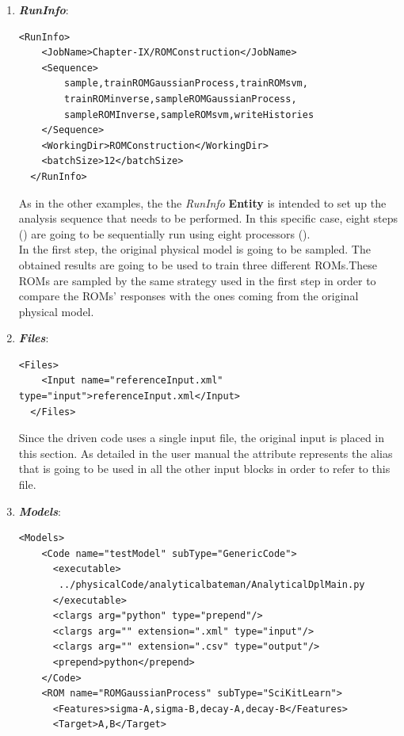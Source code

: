 \begin{enumerate}
   \item \textbf{\textit{RunInfo}}:
\begin{lstlisting}[style=XML,morekeywords={arg,extension,pauseAtEnd,overwrite}]
  <RunInfo>
    <JobName>Chapter-IX/ROMConstruction</JobName>
    <Sequence>
        sample,trainROMGaussianProcess,trainROMsvm,
        trainROMinverse,sampleROMGaussianProcess,
        sampleROMInverse,sampleROMsvm,writeHistories
    </Sequence>
    <WorkingDir>ROMConstruction</WorkingDir>
    <batchSize>12</batchSize>
  </RunInfo>
\end{lstlisting}
   As in the other examples, the the \textit{RunInfo} \textbf{Entity} is intended  to set up the analysis sequence that
   needs to be performed. In this specific case, eight steps  () are going to be sequentially run
   using eight processors ().
   \\In the first step, the original physical model is going to be sampled. The obtained results are going to be used to
   train three different ROMs.These ROMs are sampled by the same strategy used in the first step in order to compare the
   ROMs' responses with the ones coming from the original physical model.
   \item \textbf{\textit{Files}}:
\begin{lstlisting}[style=XML,morekeywords={arg,extension,pauseAtEnd,overwrite}]
  <Files>
    <Input name="referenceInput.xml" type="input">referenceInput.xml</Input>
  </Files>
\end{lstlisting}
   Since the driven code uses a single input file, the original input is placed in this section. As detailed in the user manual
   the attribute   represents the alias that is going to be
   used in all the other input blocks in order to refer to this file.
   \item \textbf{\textit{Models}}:
\begin{lstlisting}[style=XML,morekeywords={arg,extension,pauseAtEnd,overwrite}]
  <Models>
    <Code name="testModel" subType="GenericCode">
      <executable>
       ../physicalCode/analyticalbateman/AnalyticalDplMain.py
      </executable>
      <clargs arg="python" type="prepend"/>
      <clargs arg="" extension=".xml" type="input"/>
      <clargs arg="" extension=".csv" type="output"/>
      <prepend>python</prepend>
    </Code>
    <ROM name="ROMGaussianProcess" subType="SciKitLearn">
      <Features>sigma-A,sigma-B,decay-A,decay-B</Features>
      <Target>A,B</Target>

\end{lstlisting}
\end{enumerate}
